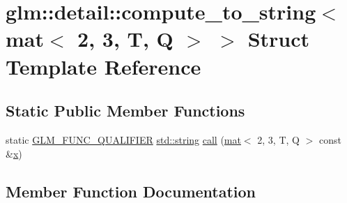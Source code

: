 \hypertarget{structglm_1_1detail_1_1compute__to__string_3_01mat_3_012_00_013_00_01_t_00_01_q_01_4_01_4}{}\section{glm\+:\+:detail\+:\+:compute\+\_\+to\+\_\+string$<$ mat$<$ 2, 3, T, Q $>$ $>$ Struct Template Reference}
\label{structglm_1_1detail_1_1compute__to__string_3_01mat_3_012_00_013_00_01_t_00_01_q_01_4_01_4}
\subsection*{Static Public Member Functions}
\begin{DoxyCompactItemize}
\item 
static \hyperlink{setup_8hpp_a33fdea6f91c5f834105f7415e2a64407}{G\+L\+M\+\_\+\+F\+U\+N\+C\+\_\+\+Q\+U\+A\+L\+I\+F\+I\+ER} \hyperlink{_s_d_l__opengl__glext_8h_ae84541b4f3d8e1ea24ec0f466a8c568b}{std\+::string} \hyperlink{structglm_1_1detail_1_1compute__to__string_3_01mat_3_012_00_013_00_01_t_00_01_q_01_4_01_4_a1459d67dba1cee7c2467271a97fab304}{call} (\hyperlink{structglm_1_1mat}{mat}$<$ 2, 3, T, Q $>$ const \&\hyperlink{_s_d_l__opengl_8h_ad0e63d0edcdbd3d79554076bf309fd47}{x})
\end{DoxyCompactItemize}


\subsection{Member Function Documentation}
\mbox{\label{structglm_1_1detail_1_1compute__to__string_3_01mat_3_012_00_013_00_01_t_00_01_q_01_4_01_4_a1459d67dba1cee7c2467271a97fab304}} 

